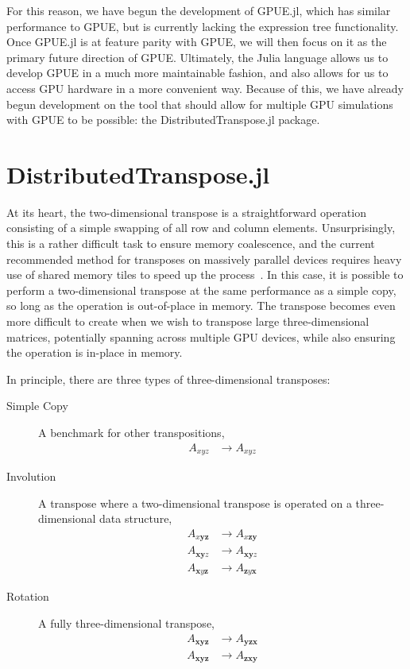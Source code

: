 For this reason, we have begun the development of GPUE.jl, which has similar performance to GPUE, but is currently lacking the expression tree functionality.
Once GPUE.jl is at feature parity with GPUE, we will then focus on it as the primary future direction of GPUE.
Ultimately, the Julia language allows us to develop GPUE in a much more maintainable fashion, and also allows for us to access GPU hardware in a more convenient way.
Because of this, we have already begun development on the tool that should allow for multiple GPU simulations with GPUE to be possible: the DistributedTranspose.jl package.

\section{DistributedTranspose.jl}
\label{sec:DT}

At its heart, the two-dimensional transpose is a straightforward operation consisting of a simple swapping of all row and column elements.
Unsurprisingly, this is a rather difficult task to ensure memory coalescence, and 
the current recommended method for transposes on massively parallel devices requires heavy use of shared memory tiles to speed up the process~\cite{harris2013}.
In this case, it is possible to perform a two-dimensional transpose at the same performance as a simple copy, so long as the operation is out-of-place in memory.
The transpose becomes even more difficult to create when we wish to transpose large three-dimensional matrices, potentially spanning across multiple GPU devices, while also ensuring the operation is in-place in memory.

In principle, there are three types of three-dimensional transposes:

\begin{description}
\item[Simple Copy]{A benchmark for other transpositions,
    \begin{align}
    A_{xyz} &\rightarrow A_{xyz}
    \end{align}}
\item[Involution]{A transpose where a two-dimensional transpose is operated on a three-dimensional data structure,
    \begin{align}
    A_{x\mathbf{yz}} &\rightarrow A_{x\mathbf{zy}} \\
    A_{\mathbf{xy}z} &\rightarrow A_{\mathbf{xy}z} \\
    A_{\mathbf{x}y\mathbf{z}} &\rightarrow A_{\mathbf{z}y\mathbf{x}}
    \end{align}}
\item[Rotation]{A fully three-dimensional transpose,
    \begin{align}
    A_{\mathbf{xyz}} &\rightarrow A_{\mathbf{yzx}} \\
    A_{\mathbf{xyz}} &\rightarrow A_{\mathbf{zxy}}
    \end{align}}
\end{description}

